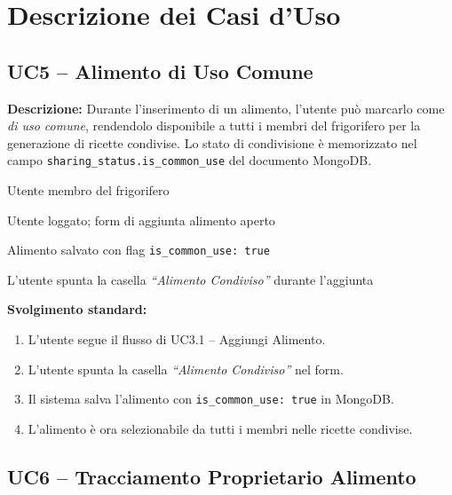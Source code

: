 \documentclass[12pt,a4paper,twoside]{report}
\newenvironment{ucbox}{%
  \begin{mdframed}[
    backgroundcolor=ucbg,
    linecolor=ucborder,
    linewidth=1pt,
    innerleftmargin=10pt,
    innerrightmargin=10pt,
    innertopmargin=8pt,
    innerbottommargin=8pt,
    roundcorner=4pt
  ]
}{%
  \end{mdframed}
}
\begin{document}
\section{Descrizione dei Casi d'Uso}

\subsection{UC5 -- Alimento di Uso Comune}

\begin{ucbox}
\textbf{Descrizione:} Durante l'inserimento di un alimento, l'utente può marcarlo come \textit{di uso comune}, rendendolo disponibile a tutti i membri del frigorifero per la generazione di ricette condivise. Lo stato di condivisione è memorizzato nel campo \texttt{sharing\_status.is\_common\_use} del documento MongoDB.

\begin{description}[leftmargin=4cm, style=sameline]
  \item[Attori Coinvolti:] Utente membro del frigorifero
  \item[Precondizione:] Utente loggato; form di aggiunta alimento aperto
  \item[Postcondizione:] Alimento salvato con flag \texttt{is\_common\_use: true}
  \item[Trigger:] L'utente spunta la casella \textit{``Alimento Condiviso''} durante l'aggiunta
\end{description}
\end{ucbox}

\textbf{Svolgimento standard:}
\begin{enumerate}
  \item L'utente segue il flusso di UC3.1 -- Aggiungi Alimento.
  \item L'utente spunta la casella \textit{``Alimento Condiviso''} nel form.
  \item Il sistema salva l'alimento con \texttt{is\_common\_use: true} in MongoDB.
  \item L'alimento è ora selezionabile da tutti i membri nelle ricette condivise.
\end{enumerate}

\newpage
\subsection{UC6 -- Tracciamento Proprietario Alimento}
\end{document}
